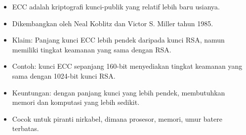 \documentclass{article}
\begin{document}

\begin{itemize}
  \item ECC adalah kriptografi kunci-publik yang relatif lebih baru usianya.
  \item Dikembangkan oleh Neal Koblitz dan Victor S. Miller tahun 1985.
  \item Klaim: Panjang kunci ECC lebih pendek daripada kunci RSA, namun memiliki tingkat keamanan yang sama dengan RSA.
  \item Contoh: kunci ECC sepanjang 160-bit menyediakan tingkat keamanan yang sama dengan 1024-bit kunci RSA.
  \item Keuntungan: dengan panjang kunci yang lebih pendek, membutuhkan memori dan komputasi yang lebih sedikit.
  \item Cocok untuk piranti nirkabel, dimana prosesor, memori, umur batere terbatas.
\end{itemize}
\end{document}
